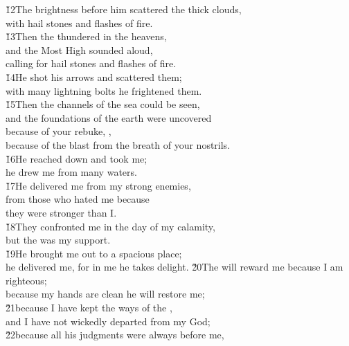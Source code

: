 \begin{poetry}
\poeml \v{12}The brightness before him scattered the thick clouds, \\
\poemll    with hail stones and flashes of fire. \\
\poeml \v{13}Then the  thundered in the heavens, \\
\poemll    and the Most High sounded aloud, \\
\poemlll       calling for hail stones and flashes of fire. \\
\poeml \v{14}He shot his arrows and scattered them; \\
\poemll    with many lightning bolts he frightened them. \\
\poeml \v{15}Then the channels of the sea could be seen, \\
\poemll    and the foundations of the earth were uncovered \\
\poeml because of your rebuke, , \\
\poemll    because of the blast from the breath of your nostrils. \\
\poeml \v{16}He reached down and took me; \\
\poemll    he drew me from many waters. \\
\poeml \v{17}He delivered me from my strong enemies, \\
\poemll    from those who hated me because \\
\poemlll       they were stronger than I. \\
\poeml \v{18}They confronted me in the day of my calamity, \\
\poemll    but the  was my support. \\
\poeml \v{19}He brought me out to a spacious place; \\
\poemll    he delivered me, for in me he takes delight.
\poeml \v{20}The  will reward me because I am righteous; \\
\poemll    because my hands are clean he will restore me; \\
\poeml \v{21}because I have kept the ways of the , \\
\poemll    and I have not wickedly departed from my God; \\
\poeml \v{22}because all his judgments were always before me, \\

\end{poetry}
